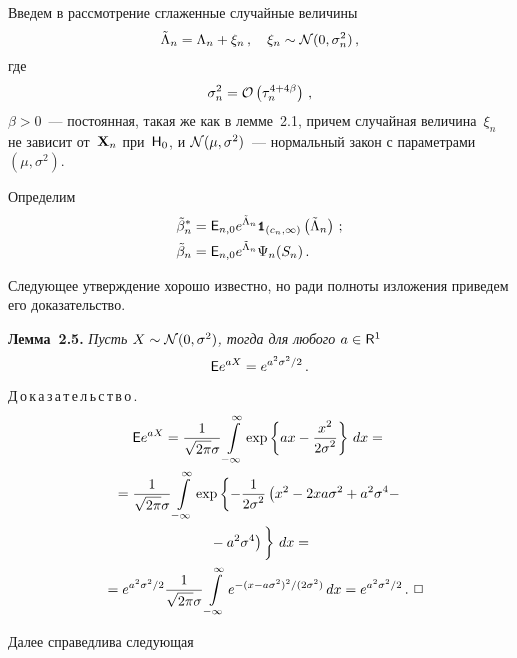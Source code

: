 \begin{multicols}{2}
\smallskip

Введем в рассмотрение сглаженные случайные величины
\begin{equation}
\tilde\Lambda_n=\Lambda_n+\xi_n\,, \quad \xi_n\sim{\cal N}(0,\sigma_n^2)\,,
\label{e2.15}
\end{equation}
где
\begin{equation}
\sigma_n^2={\cal O}\left(\tau_n^{4+4\beta}\right)\,,
\label{e2.16}
\end{equation}
$\beta>0$~--- постоянная, такая же как в лемме~2.1, причем случайная величина~$\xi_n$ не зависит 
от~${\bf X}_n$ при~${\sf H}_0$, и ${\cal N}(\mu,\sigma^2)$~--- нормальный закон с 
параметрами~$(\mu,\sigma^2)$.

Определим
\begin{align*}
\tilde\beta_n^*&={\e}_{n,0}e^{\tilde\Lambda_n}{\Ik}_{(c_n,\infty)}\left(\tilde\Lambda_n\right)\,;
\\
\tilde\beta_n &= {\e}_{n,0}e^{\tilde\Lambda_n}\Psi_n(S_n)\,. %
\end{align*}

Следующее утверждение хорошо известно, но ради полноты изложения приведем его доказательство.

\smallskip

\noindent
\textbf{Лемма~2.5.} {\it Пусть $X\sim{\cal N}(0,\sigma^2)$, тогда для любого $a\in{\sf R}^1$
$$
{{\sf E}}e^{aX}=e^{a^2\sigma^2/2}\,.
$$}


\smallskip

\noindent
Д\,о\,к\,а\,з\,а\,т\,е\,л\,ь\,с\,т\,в\,о\,.\
\begin{multline*}
{\e}e^{aX}=\fr{1}{\sqrt{2\pi}\sigma}\int\limits_{-\infty}^{\infty}\exp\left\{ax-\fr{x^2}{2\sigma^2}\right\}\,dx={}\\
{}=\fr{1}{\sqrt{2\pi}\sigma}\int\limits_{-\infty}^{\infty}
\exp \left\{-\fr{1}{2\sigma^2}\left(x^2-2xa\sigma^2+a^2\sigma^4-\right.\right.{}\\
\left.\left.{}-a^2\sigma^4\right)
\vphantom{-\fr{1}{2\sigma^2}} \right\}\,dx={}\\
{}
=e^{{a^2\sigma^2}/{2}}\fr{1}{\sqrt{2\pi}\sigma}\int\limits_{-\infty}^{\infty}
e^{-{(x-a\sigma^2)^2}/(2\sigma^2)}\,dx=
e^{{a^2\sigma^2}/2}\,.~\Box\hspace*{-5.86pt}
\end{multline*}



Далее справедлива следующая

\smallskip


\end{multicols}
